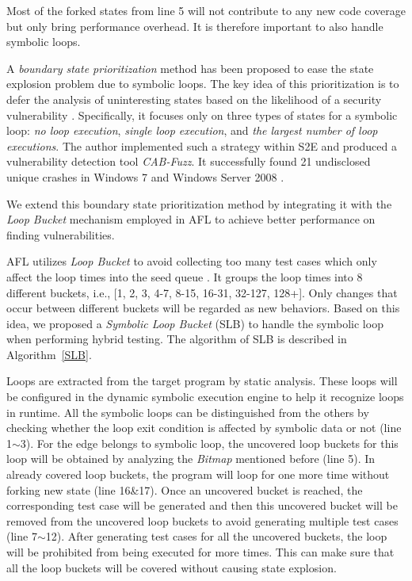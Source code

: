 Most of the forked states from line 5 will not contribute to any new code coverage but only bring performance overhead.
 It is therefore important to also handle symbolic loops. 

A \textit{boundary state prioritization} method has been proposed to ease the state explosion problem due to symbolic loops.
 The key idea of this prioritization is to defer the analysis of uninteresting states based on the likelihood of a security vulnerability \cite{cab-fuzz}. 
 Specifically, it focuses only on three types of states for a symbolic loop: \textit{no loop execution}, \textit{single loop execution}, and \textit{the largest number of loop executions}.
 The author implemented such a strategy within S2E \cite{chipounov2011s2e} and produced a vulnerability detection tool \textit{CAB-Fuzz}.
 It successfully found 21 undisclosed unique crashes in Windows 7 and Windows Server 2008 \cite{cab-fuzz}.
 
We extend this boundary state prioritization method by integrating it with the \emph{Loop Bucket} mechanism employed in AFL \cite{online:afl} to achieve better performance on finding vulnerabilities.
 
AFL utilizes \emph{Loop Bucket} to avoid collecting too many test cases which only affect the loop times into the seed queue \cite{online:afl}. It groups the loop times into 8 different buckets, i.e., [1, 2, 3, 4-7, 8-15, 16-31, 32-127, 128+]. Only changes that occur between different buckets will be regarded as new behaviors. Based on this idea, we proposed a \textit{Symbolic Loop Bucket} (SLB) to handle the symbolic loop when performing hybrid testing. The algorithm of SLB is described in Algorithm~\ref{SLB}.

Loops are extracted from the target program by static analysis. These loops will be configured in the dynamic symbolic execution engine to help it recognize loops in runtime. All the symbolic loops can be distinguished from the others by checking whether the loop exit condition is affected by symbolic data or not (line 1$\sim$3). For the edge belongs to symbolic loop, the uncovered loop buckets for this loop will be obtained by analyzing the \textit{Bitmap} mentioned before (line 5). 
In already covered loop buckets, the program will loop for one more time without forking new state (line 16\&17). Once an uncovered bucket is reached, the corresponding test case will be generated and then this uncovered bucket will be removed from the uncovered loop buckets to avoid generating multiple test cases (line 7$\sim$12). After generating test cases for all the uncovered buckets, the loop will be prohibited from being executed for more times. This can make sure that all the loop buckets will be covered without causing state explosion.

